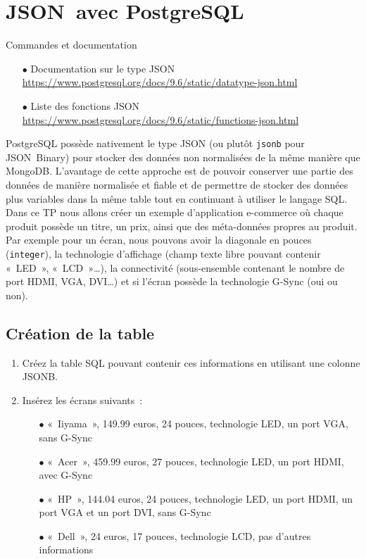 \documentclass[a4paper,10pt]{article}
\begin{document}
\section{JSON avec PostgreSQL}
  \begin{bclogo}[logo = \bctakecare, arrondi = 0.1, ombre = true , epOmbre = 0.1, couleurOmbre = black!30,  barre =none, couleurBarre=bleuF]{Commandes et documentation}
    \begin{itemize}
    \item[$\bullet$] Documentation sur le type JSON \url{https://www.postgresql.org/docs/9.6/static/datatype-json.html}
    \item[$\bullet$] Liste des fonctions JSON \url{https://www.postgresql.org/docs/9.6/static/functions-json.html}
   \end{itemize}
  \end{bclogo}

  PostgreSQL possède nativement le type JSON (ou plutôt \texttt{jsonb} pour JSON Binary) pour stocker des données non normalisées de la même manière que MongoDB. L'avantage de cette approche est de pouvoir conserver une partie des données de manière normalisée et fiable et de permettre de stocker des données plus variables dans la même table tout en continuant à utiliser le langage SQL.\\

  Dans ce TP nous allons créer un exemple d'application e-commerce où chaque produit possède un titre, un prix, ainsi que des méta-données propres au produit. Par exemple pour un écran, nous pouvons avoir la diagonale en pouces (\texttt{integer}), la technologie d'affichage (champ texte libre pouvant contenir « LED », « LCD »…), la connectivité (sous-ensemble contenant le nombre de port HDMI, VGA, DVI…) et si l'écran possède la technologie G-Sync (oui ou non).\\

  \subsection{Création de la table}
    \begin{enumerate}
      \item Créez la table SQL pouvant contenir ces informations en utilisant une colonne JSONB.
      \item Insérez les écrans suivants :
          \begin{itemize}
            \item[$\bullet$] « Iiyama », 149.99 euros, 24 pouces, technologie LED, un port VGA, sans G-Sync
            \item[$\bullet$] « Acer », 459.99 euros, 27 pouces, technologie LED, un port HDMI, avec G-Sync
            \item[$\bullet$] « HP », 144.04 euros, 24 pouces, technologie LED, un port HDMI, un port VGA et un port DVI, sans G-Sync
            \item[$\bullet$] « Dell », 24 euros, 17 pouces,  technologie LCD, pas d'autres informations
         \end{itemize}
    \end{enumerate}
\end{document}
